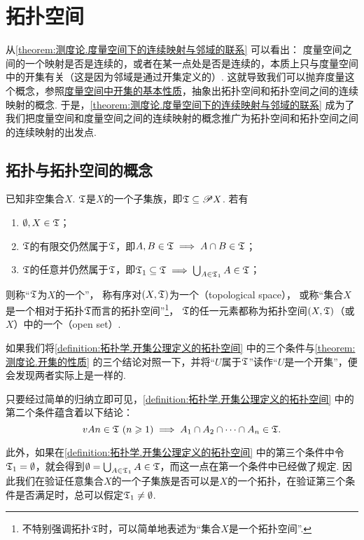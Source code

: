 \section{拓扑空间}
从\cref{theorem:测度论.度量空间下的连续映射与邻域的联系} 可以看出：
度量空间之间的一个映射是否是连续的，或者在某一点处是否是连续的，本质上只与度量空间中的开集有关（这是因为邻域是通过开集定义的）.
这就导致我们可以抛弃度量这个概念，参照\hyperref[theorem:测度论.开集的性质]{度量空间中开集的基本性质}，抽象出拓扑空间和拓扑空间之间的连续映射的概念.
于是，\cref{theorem:测度论.度量空间下的连续映射与邻域的联系} 成为了我们把度量空间和度量空间之间的连续映射的概念推广为拓扑空间和拓扑空间之间的连续映射的出发点.

\subsection{拓扑与拓扑空间的概念}
\begin{definition}\label{definition:拓扑学.开集公理定义的拓扑空间}
已知非空集合\(X\).
\(\mathfrak T\)是\(X\)的一个子集族，即\(\mathfrak T \subseteq \mathscr{P} X\).
若有
\begin{enumerate}
\item \(\emptyset,X \in \mathfrak T\)；
\item \(\mathfrak T\)的有限交仍然属于\(\mathfrak T\)，即\(A,B \in \mathfrak T \implies A \cap B \in \mathfrak T\)；
\item \(\mathfrak T\)的任意并仍然属于\(\mathfrak T\)，即\(\mathfrak T_1 \subseteq \mathfrak T \implies \bigcup_{A \in \mathfrak T_1} A \in \mathfrak T\)；
\end{enumerate}
则称“\(\mathfrak T\)为\(X\)的一个”，%
称有序对\((X,\mathfrak T)\)为一个（topological space），%
或称“集合\(X\)是一个相对于拓扑\(\mathfrak T\)而言的拓扑空间”\footnote{%
不特别强调拓扑\(\mathfrak T\)时，可以简单地表述为“集合\(X\)是一个拓扑空间”.%
}，%
\(\mathfrak T\)的任一元素都称为拓扑空间\((X,\mathfrak T)\)（或\(X\)）中的一个（open set）.
\end{definition}
如果我们将\cref{definition:拓扑学.开集公理定义的拓扑空间} 中的三个条件与\cref{theorem:测度论.开集的性质} 的三个结论对照一下，并将“\(U\)属于\(\mathfrak T\)”读作“\(U\)是一个开集”，便会发现两者实际上是一样的.

只要经过简单的归纳立即可见，\cref{definition:拓扑学.开集公理定义的拓扑空间} 中的第二个条件蕴含着以下结论：\[
v{A}{n}\in\mathfrak T\ (n\geqslant1)
\implies
A_1 \cap A_2 \cap \dotsb \cap A_n \in \mathfrak T.
\]

此外，如果在\cref{definition:拓扑学.开集公理定义的拓扑空间} 中的第三个条件中令\(\mathfrak T_1=\emptyset\)，就会得到\(\emptyset = \bigcup_{A\in\mathfrak T_1} A \in \mathfrak T\)，而这一点在第一个条件中已经做了规定.
因此我们在验证任意集合\(X\)的一个子集族是否可以是\(X\)的一个拓扑，在验证第三个条件是否满足时，总可以假定\(\mathfrak T_1\neq\emptyset\).

